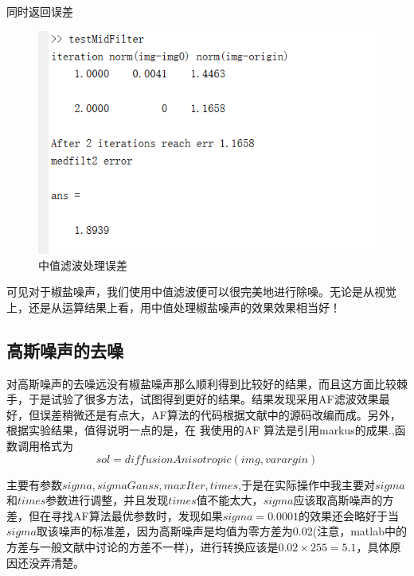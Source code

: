 \documentclass[a4paper,left=2.5cm,right=2.5cm]{article}
\begin{document}
\begin{spacing}{1.6}
		同时返回误差
		\begin{figure}[H]
			\includegraphics[width=\textwidth]{image/result_test_med1.png}
			\caption{中值滤波处理误差}
		\end{figure}
	
		可见对于椒盐噪声，我们使用中值滤波便可以很完美地进行除噪。无论是从视觉上，还是从运算结果上看，用中值处理椒盐噪声的效果效果相当好！
	
	\subsection{高斯噪声的去噪}
		对高斯噪声的去噪远没有椒盐噪声那么顺利得到比较好的结果，而且这方面比较棘手，于是试验了很多方法，试图得到更好的结果。结果发现采用AF滤波效果最好，但误差稍微还是有点大，AF算法的代码根据文献\cite{hal}中的源码改编而成。另外，根据实验结果，值得说明一点的是，在
		我使用的AF 算法是引用markus的成果.\cite{code},函数调用格式为
		$$sol = diffusionAnisotropic(img, varargin)$$
		
		主要有参数$sigma,sigmaGauss,maxIter,times$,于是在实际操作中我主要对$sigma$和$times$参数进行调整，并且发现$times$值不能太大，$sigma$应该取高斯噪声的方差，但在寻找AF算法最优参数时，发现如果$sigma = 0.0001$的效果还会略好于当$sigma$取该噪声的标准差，因为高斯噪声是均值为零方差为0.02(注意，matlab中的方差与一般文献中讨论的方差不一样)，进行转换应该是$0.02\times 255 = 5.1$，具体原因还没弄清楚。
		

\end{spacing}
\end{document}

